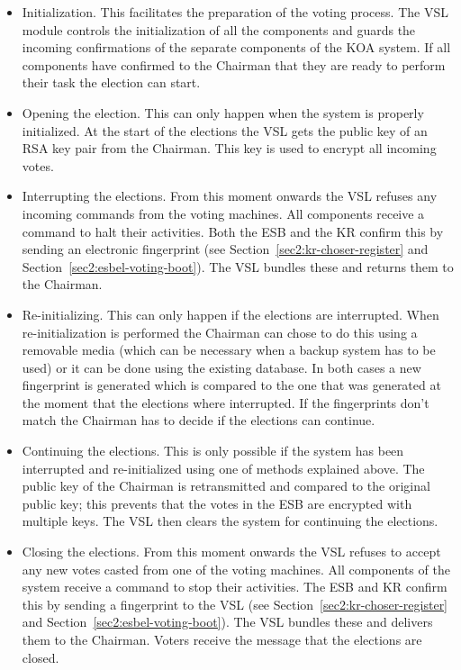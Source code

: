 \begin{itemize}
	\item Initialization. This facilitates the preparation of the
	voting process. The VSL module controls the initialization of
	all the components and guards the incoming confirmations of
	the separate components of the KOA system. If all components
	have confirmed to the Chairman that they are ready to perform
	their task the election can start.

	\item Opening the election. This can only happen when the
	system is properly initialized. At the start of the elections
	the VSL gets the public key of an RSA key pair from the
	Chairman. This key is used to encrypt all incoming votes.

	\item Interrupting the elections. From this moment onwards the
	VSL refuses any incoming commands from the voting
	machines. All components receive a command to halt their
	activities. Both the ESB and the KR confirm this by sending an
	electronic fingerprint (see
	Section~\ref{sec2:kr-choser-register} and
	Section~\ref{sec2:esbel-voting-boot}). The VSL bundles these
	and returns them to the Chairman.

	\item Re-initializing. This can only happen if the elections are
	interrupted. When re-initialization is performed the Chairman
	can chose to do this using a removable media (which can be
	necessary when a backup system has to be used) or it can be
	done using the existing database. In both cases a new
	fingerprint is generated which is compared to the one that was
	generated at the moment that the elections where
	interrupted. If the fingerprints don't match the Chairman has
	to decide if the elections can continue.

	\item Continuing the elections. This is only possible if the
	system has been interrupted and re-initialized using one of
	methods explained above. The public key of the Chairman is
	retransmitted and compared to the original public key; this
	prevents that the votes in the ESB are encrypted with multiple
	keys. The VSL then clears the system for continuing the
	elections.

	\item Closing the elections. From this moment onwards the VSL
	refuses to accept any new votes casted from one of the voting
	machines. All components of the system receive a command to
	stop their activities. The ESB and KR confirm this by sending
	a fingerprint to the VSL (see
	Section~\ref{sec2:kr-choser-register} and
	Section~\ref{sec2:esbel-voting-boot}). The VSL bundles these
	and delivers them to the Chairman. Voters receive the message
	that the elections are closed.


\end{itemize}
